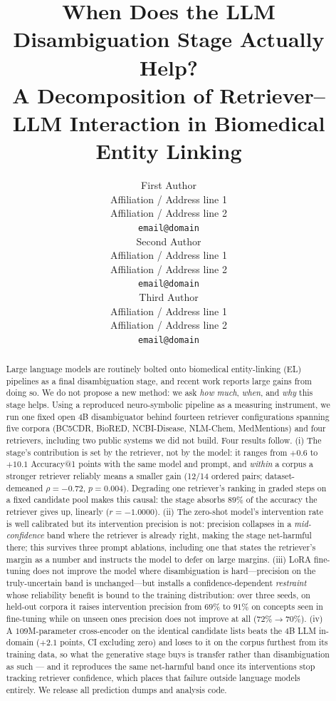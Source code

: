 \documentclass[11pt]{article}
\title{When Does the LLM Disambiguation Stage Actually Help?\\
A Decomposition of Retriever--LLM Interaction in Biomedical Entity Linking}
\author{First Author \\
  Affiliation / Address line 1 \\
  Affiliation / Address line 2 \\
  \texttt{email@domain} \\\And
  Second Author \\
  Affiliation / Address line 1 \\
  Affiliation / Address line 2 \\
  \texttt{email@domain} \\\And
  Third Author \\
  Affiliation / Address line 1 \\
  Affiliation / Address line 2 \\
  \texttt{email@domain} \\}
\makeatletter
\newcommand{\acc}{Accuracy@1}
\makeatother
\begin{document}
\maketitle

\begin{abstract}
Large language models are routinely bolted onto biomedical entity-linking (EL)
pipelines as a final disambiguation stage, and recent work reports large gains from
doing so. We do not propose a new method: we ask \emph{how much}, \emph{when}, and
\emph{why} this stage helps. Using a reproduced neuro-symbolic pipeline as a
measuring instrument, we run one fixed open 4B disambiguator behind fourteen
retriever configurations spanning five corpora (BC5CDR, BioRED, NCBI-Disease,
NLM-Chem, MedMentions) and four retrievers, including two public systems we did not
build. Four results follow. (i) The stage's contribution is set by the retriever,
not by the model: it ranges from $+0.6$ to $+10.1$ \acc{} points with the same model
and prompt, and \emph{within} a corpus a stronger retriever reliably means a smaller
gain (12/14 ordered pairs; dataset-demeaned $\rho=-0.72$, $p=0.004$). Degrading one
retriever's ranking in graded steps on a fixed candidate pool makes this causal: the
stage absorbs $89\%$ of the accuracy the retriever gives up, linearly
($r=-1.0000$). (ii) The
zero-shot model's intervention rate is well calibrated but its intervention
precision is not: precision collapses in a \emph{mid-confidence} band where the
retriever is already right, making the stage net-harmful there; this survives three
prompt ablations, including one that states the retriever's margin as a number and
instructs the model to defer on large margins. (iii) LoRA fine-tuning does not improve the model where
disambiguation is hard---precision on the truly-uncertain band is unchanged---but
installs a confidence-dependent \emph{restraint} whose reliability benefit is bound
to the training distribution: over three seeds, on held-out corpora it raises
intervention precision from $69\%$ to $91\%$ on concepts seen in fine-tuning while on
unseen ones precision does not improve at all ($72\% \to 70\%$). (iv) A $109$M-parameter
cross-encoder on the identical candidate lists beats the $4$B LLM in-domain
($+2.1$ points, CI excluding zero) and loses to it on the corpus furthest from its
training data, so what the generative stage buys is transfer rather than
disambiguation as such --- and it reproduces the same net-harmful band once its
interventions stop tracking retriever confidence, which places that failure outside
language models entirely. We release all prediction dumps and analysis code.
\end{abstract}
\end{document}
